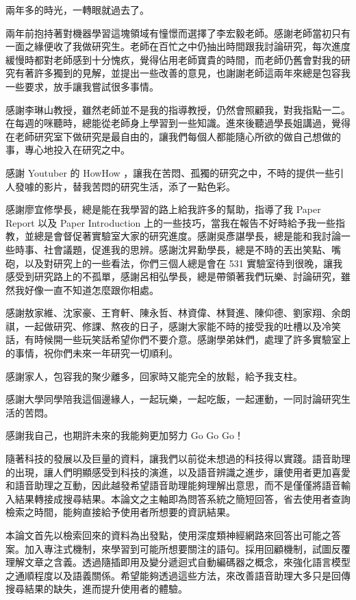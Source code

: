 \NTUtitlepage  %

\newpage
\setcounter{page}{1}


\mydoublespacing
\begin{acknowledgement} %
兩年多的時光，一轉眼就過去了。

   兩年前抱持著對機器學習這塊領域有憧憬而選擇了李宏毅老師。感謝老師當初只有一面之緣便收了我做研究生。老師在百忙之中仍抽出時間跟我討論研究，每次進度緩慢時都對老師感到十分愧疚，覺得佔用老師寶貴的時間，而老師仍舊會對我的研究有著許多獨到的見解，並提出一些改善的意見，也謝謝老師這兩年來總是包容我一些要求，放手讓我嘗試很多事情。

   感謝李琳山教授，雖然老師並不是我的指導教授，仍然會照顧我，對我指點一二。在每週的咪聽時，總能從老師身上學習到一些知識。進來後聽過學長姐講過，覺得在老師研究室下做研究是最自由的，讓我們每個人都能隨心所欲的做自己想做的事，專心地投入在研究之中。

   感謝 Youtuber 的 HowHow ，讓我在苦悶、孤獨的研究之中，不時的提供一些引人發噱的影片，替我苦悶的研究生活，添了一點色彩。

   感謝廖宜修學長，總是能在我學習的路上給我許多的幫助，指導了我 Paper Report 以及 Paper Introduction 上的一些技巧，當我在報告不好時給予我一些指教，並總是會督促著實驗室大家的研究進度。感謝吳彥諶學長，總是能和我討論一些時事、社會議題，促進我的思辨。感謝沈昇勳學長，總是不時的丟出笑點、嘴砲，以及對研究上的一些看法，你們三個人總是會在 531 實驗室待到很晚，讓我感受到研究路上的不孤單，感謝呂相弘學長，總是帶領著我們玩樂、討論研究，雖然我好像一直不知道怎麼跟你相處。

   感謝敖家維、沈家豪、王育軒、陳永哲、林資偉、林賢進、陳仰德、劉家翔、余朗祺，一起做研究、修課、熬夜的日子，感謝大家能不時的接受我的吐槽以及冷笑話，有時候開一些玩笑話希望你們不要介意。感謝學弟妹們，處理了許多實驗室上的事情，祝你們未來一年研究一切順利。
   
   感謝家人，包容我的聚少離多，回家時又能完全的放鬆，給予我支柱。

   感謝大學同學陪我這個邊緣人，一起玩樂，一起吃飯，一起運動，一同討論研究生活的苦悶。

   感謝我自己，也期許未來的我能夠更加努力 Go Go Go！
\end{acknowledgement}

\begin{zhAbstract}  %
    隨著科技的發展以及巨量的資料，讓我們以前從未想過的科技得以實踐。語音助理的出現，讓人們明顯感受到科技的演進，以及語音辨識之進步，讓使用者更加喜愛和語音助理之互動，因此越發希望語音助理能夠理解出意思，而不是僅僅將語音輸入結果轉接成搜尋結果。本論文之主軸即為問答系統之簡短回答，省去使用者查詢檢索之時間，能夠直接給予使用者所想要的資訊結果。

    本論文首先以檢索回來的資料為出發點，使用深度類神經網路來回答出可能之答案。加入專注式機制，來學習到可能所想要關注的語句。採用回顧機制，試圖反覆理解文章之含義。透過隨插即用及變分遞迴式自動編碼器之概念，來強化語言模型之通順程度以及語義關係。希望能夠透過這些方法，來改善語音助理大多只是回傳搜尋結果的缺失，進而提升使用者的體驗。
\end{zhAbstract}

{
\mysinglespacing\selectfont
\tableofcontents %

\listoffigures  %

\listoftables  %
\par
}

\newpage
\setcounter{page}{1}
